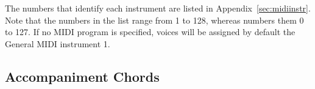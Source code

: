 \documentclass[a4paper,12pt]{book}
\begin{document}
The numbers that identify each instrument are listed in
Appendix~\ref{sec:midiinstr}. Note that the numbers in the list range from
1 to 128, whereas \abcmid{} numbers them 0 to 127.  If no MIDI program is
specified, voices will be assigned by default the General MIDI instrument
1.












\subsection{Accompaniment Chords}
\label{sec:midichords}
\end{document}
